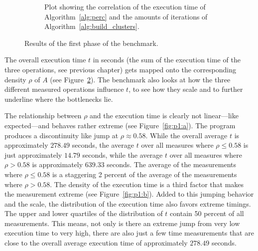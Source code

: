 \documentclass[twoside,11pt]{article}
\begin{document}
\begin{figure}[htbp]
\begin{center}
\begin{subfigure}[b]{0.49\textwidth}
\caption{Plot showing the correlation of the execution time
of Algorithm~\ref{alg:perc} and the amounts of iterations
of Algorithm~\ref{alg:build_clusters}.}
\label{fig:p1:e}
\end{subfigure}

\caption{Results of the first phase of the benchmark.}
\label{fig:p1}
\end{center}
\end{figure}

The overall execution time $t$ in seconds (the sum
of the execution time of the three operations, see previous
chapter) gets mapped onto the corresponding density $\rho$
of $A$ (see Figure~\ref{fig:p1}).
The benchmark also looks at how the three different
measured operations influence $t$, to see how they scale
and to further underline where the bottlenecks lie.

The relationship between $\rho$ and the execution time
is clearly not linear---like expected---and behaves rather
extreme (see Figure~\ref{fig:p1:a}).
The program produces a discontinuity like jump at $\rho
\approx 0.58$.
While the overall average $t$ is approximately
$278.49$ seconds, the average $t$ over all measures where
$\rho \leq 0.58$ is just approximately $14.79$ seconds,
while the average $t$ over all measures where $\rho > 0.58$
is approximately $639.33$ seconds.
The average of the measurements where $\rho \leq 0.58$ is
a staggering 2 percent of the average of the measurements
where $\rho > 0.58$.
The density of the execution time is a third factor that
makes the measurement extreme (see Figure~\ref{fig:p1:b}).
Added to this jumping behavior and the scale, the
distribution of the execution time also favors extreme
timings.
The upper and lower quartiles of the distribution of $t$
contain 50 percent of all measurements.
This means, not only is there an extreme jump from very
low execution time to very high, there are also just a
few time measurements that are close to the overall average
execution time of approximately $278.49$ seconds.
\end{document}

